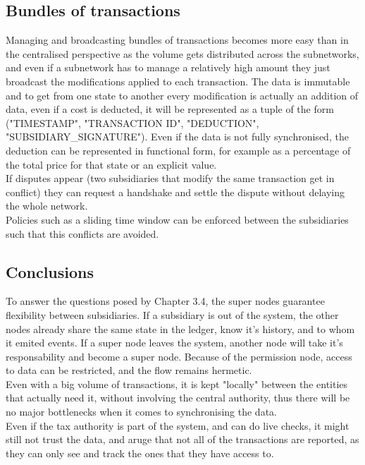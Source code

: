 \subsection{Bundles of transactions}
Managing and broadcasting bundles of transactions becomes more easy than in the centralised perspective as the volume gets distributed across the subnetworks, and even if a subnetwork has to manage a relatively high amount they just broadcast the modifications applied to each transaction. The data is immutable and to get from one state to another every modification is actually an addition of data, even if a cost is deducted, it will be represented as a tuple of the form ("TIMESTAMP", "TRANSACTION ID", "DEDUCTION", "SUBSIDIARY\_SIGNATURE"). Even if the data is not fully synchronised, the deduction can be represented in functional form, for example as a percentage of the total price for that state or an explicit value.\\
If disputes appear (two subsidiaries that modify the same transaction get in conflict) they can request a handshake and settle the dispute without delaying the whole network.\\
Policies such as a sliding time window\cite{timewindow} can be enforced between the subsidiaries such that this conflicts are avoided.

\subsection{Conclusions}
To answer the questions posed by Chapter 3.4, the super nodes guarantee flexibility between subsidiaries. If a subsidiary is out of the system, the other nodes already share the same state in the ledger, know it's history, and to whom it emited events. If a super node leaves the system, another node will take it's responsability and become a super node. Because of the permission node, access to data can be restricted, and the flow remains hermetic.\\
Even with a big volume of transactions, it is kept "locally" between the entities that actually need it, without involving the central authority, thus there will be no major bottlenecks when it comes to synchronising the data.\\
Even if the tax authority is part of the system, and can do live checks, it might still not trust the data, and aruge that not all of the transactions are reported, as they can only see and track the ones that they have access to.

